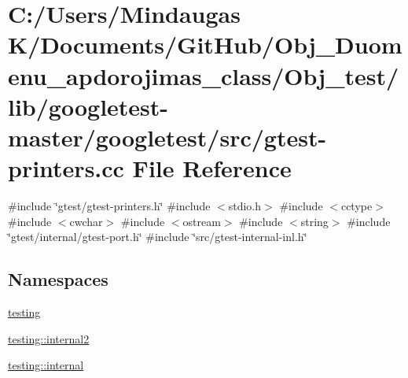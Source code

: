 \hypertarget{_obj__test_2lib_2googletest-master_2googletest_2src_2gtest-printers_8cc}{}\section{C\+:/\+Users/\+Mindaugas K/\+Documents/\+Git\+Hub/\+Obj\+\_\+\+Duomenu\+\_\+apdorojimas\+\_\+class/\+Obj\+\_\+test/lib/googletest-\/master/googletest/src/gtest-\/printers.cc File Reference}
\label{_obj__test_2lib_2googletest-master_2googletest_2src_2gtest-printers_8cc}
{\ttfamily \#include \char`\"{}gtest/gtest-\/printers.\+h\char`\"{}}\newline
{\ttfamily \#include $<$stdio.\+h$>$}\newline
{\ttfamily \#include $<$cctype$>$}\newline
{\ttfamily \#include $<$cwchar$>$}\newline
{\ttfamily \#include $<$ostream$>$}\newline
{\ttfamily \#include $<$string$>$}\newline
{\ttfamily \#include \char`\"{}gtest/internal/gtest-\/port.\+h\char`\"{}}\newline
{\ttfamily \#include \char`\"{}src/gtest-\/internal-\/inl.\+h\char`\"{}}\newline
\subsection*{Namespaces}
\begin{DoxyCompactItemize}
\item 
 \mbox{\hyperlink{namespacetesting}{testing}}
\item 
 \mbox{\hyperlink{namespacetesting_1_1internal2}{testing\+::internal2}}
\item 
 \mbox{\hyperlink{namespacetesting_1_1internal}{testing\+::internal}}
\end{DoxyCompactItemize}
